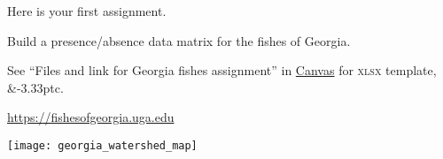 \documentclass[t]{beamer}
\makeatletter
\DeclareRobustCommand{\amper}{{\amperfont\ifx\f@shape\scname\smaller[1.2]\fi\&}\xspace}
\makeatother
\begin{document}


{
	\begin{frame}[t,plain]{Here is your first assignment.}
	
	\hangpara Build a presence/absence data matrix for the fishes of Georgia.
	
	\hangpara See “Files and link for Georgia fishes assignment” in \href{https://semo.instructure.com}{Canvas} for \textsc{xlsx} template, \amper\kern-3.33ptc. %
	
	\hangpara \url{https://fishesofgeorgia.uga.edu}
	
\end{frame}
}

%
%
%
%
%
%
%
%
%
%
%
%

\begin{frame}
	\centering
	\texttt{[image: georgia\_watershed\_map]}
\end{frame}
\end{document}
